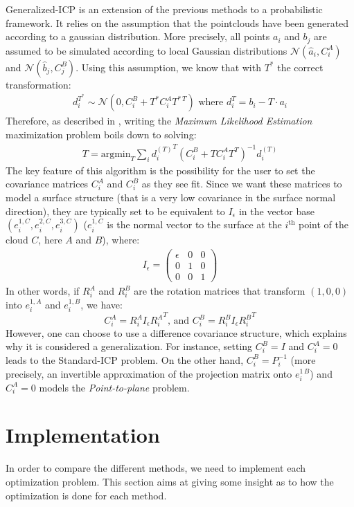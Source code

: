 \documentclass[11pt,letterpaper,leqno]{article}
\begin{document}
Generalized-ICP is an extension of the previous methods to a probabilistic framework. It relies on the assumption that the pointclouds have been generated according to a gaussian distribution. More precisely, all points $a_i$ and $b_j$ are assumed to be simulated according to local Gaussian distributions $\mathcal{N}(\hat{a}_i, C_i^A)$ and $\mathcal{N}(\hat{b}_j, C_j^B)$. Using this assumption, we know that with $T^*$ the correct transformation:
\begin{align*}
    d_i^{T^*} \sim \mathcal{N}\left(0, C_i^B + T^* C_i^AT^{*\,T}\right) \text{ where } d_i^T = b_i - T \cdot a_i
\end{align*}
Therefore, as described in \cite{generalized-icp}, writing the \textit{Maximum Likelihood Estimation} maximization problem boils down to solving:
\begin{align*}
    T = \text{argmin}_{T} \sum_i {d_i^{(T)}}^T (C_i^B + T C_i^A T^T)^{-1} d_i^{(T)}
\end{align*}
The key feature of this algorithm is the possibility for the user to set the covariance matrices $C_i^A$ and $C_i^B$ as they see fit. Since we want these matrices to model a surface structure (that is a very low covariance in the surface normal direction), they are typically set to be equivalent to $I_\epsilon$ in the vector base $(e^{1, C}_i, e^{2,C}_i, e^{3,C}_i)$ ($e^{1, C}_i$ is the normal vector to the surface at the $i^{\text{th}}$ point of the cloud $C$, here $A$ and $B$), where:
\begin{align*}
    I_\epsilon = 
    \begin{pmatrix}
        \epsilon & 0 & 0\\0 &1&0\\0&0&1
    \end{pmatrix}
\end{align*}
In other words, if $R_i^A$ and $R_i^B$ are the rotation matrices that transform $(1,0,0)$ into $e_i^{1,A}$ and $e_i^{1,B}$, we have:
$$
C_i^A = R_i^A I_\epsilon {R_i^{A}}^T \text{, and } C_i^B = R_i^B I_\epsilon {R_i^{B}}^{T}
$$
However, one can choose to use a difference covariance structure, which explains why it is considered a generalization. For instance, setting $C_i^B = I$ and $C_i^A = 0$ leads to the Standard-ICP problem. On the other hand, $C_i^B = P_i^{-1}$ (more precisely, an invertible approximation of the projection matrix onto $e_i^{1\,B}$) and $C_i^A = 0$ models the \textit{Point-to-plane} problem.
\section{Implementation}
In order to compare the different methods, we need to implement each optimization problem. This section aims at giving some insight as to how the optimization is done for each method.
\end{document}
